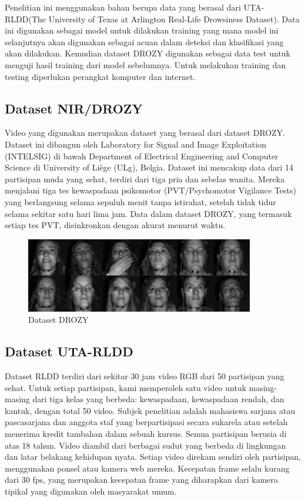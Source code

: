 Penelitian ini menggunakan bahan berupa data yang berasal dari UTA-RLDD(The University of Texas at Arlington Real-Life Drowsiness Dataset).  Data ini digunakan sebagai model untuk dilakukan training yang mana model ini selanjutnya akan digunakan sebagai acuan dalam deteksi dan klasifikasi yang akan dilakukan. Kemudian dataset DROZY digunakan sebagai data test untuk menguji hasil training dari model sebelumnya. Untuk melakukan training dan testing diperlukan perangkat komputer dan internet.

\subsection{Dataset NIR/DROZY}
\label{subsec:Drozy}

Video yang digunakan merupakan dataset yang berasal dari dataset DROZY. Dataset ini dibangun oleh Laboratory for Signal and Image Exploitation (INTELSIG) di bawah Department of Electrical Engineering and Computer Science di University of Liège (ULg), Belgia. Dataset ini mencakup data dari 14 partisipan muda yang sehat, terdiri dari tiga pria dan sebelas wanita. Mereka menjalani tiga tes kewaspadaan psikomotor (PVT/Psychomotor Vigilance Tests) yang berlangsung selama sepuluh menit tanpa istirahat, setelah tidak tidur selama sekitar satu hari lima jam. Data dalam dataset DROZY, yang termasuk setiap tes PVT, disinkronkan dengan akurat menurut waktu.

\begin{figure} [H] \centering
  \includegraphics[scale=1]{gambar/3_1_5.jpg}
  \caption{Dataset DROZY}
  \label{fig:Drozy}
\end{figure}


\subsection{Dataset UTA-RLDD}
\label{subsec:UTARLDD}

Dataset RLDD terdiri dari sekitar 30 jam video RGB dari 50 partisipan yang sehat. Untuk setiap partisipan, kami memperoleh satu video untuk masing-masing dari tiga kelas yang berbeda: kewaspadaan, kewaspadaan rendah, dan kantuk, dengan total 50 video. Subjek penelitian adalah mahasiswa sarjana atau pascasarjana dan anggota staf yang berpartisipasi secara sukarela atau setelah menerima kredit tambahan dalam sebuah kursus. Semua partisipan berusia di atas 18 tahun.
Video diambil dari berbagai sudut yang berbeda di lingkungan dan latar belakang kehidupan nyata. Setiap video direkam sendiri oleh partisipan, menggunakan ponsel atau kamera web mereka. Kecepatan frame selalu kurang dari 30 fps, yang merupakan kecepatan frame yang diharapkan dari kamera tipikal yang digunakan oleh masyarakat umum.


